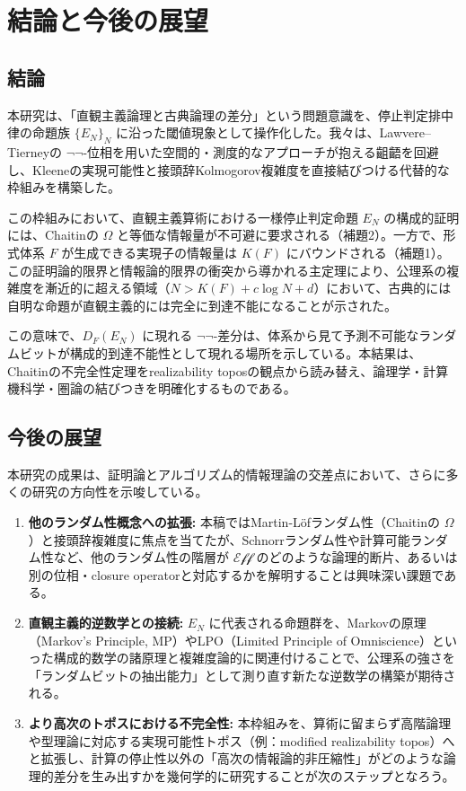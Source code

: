 \documentclass[a4paper,11pt]{ltjsarticle}
\theoremstyle{plain}
\begin{document}
\section{結論と今後の展望}

\subsection{結論}

本研究は、「直観主義論理と古典論理の差分」という問題意識を、停止判定排中律の命題族 $\{E_N\}_N$ に沿った閾値現象として操作化した。我々は、Lawvere--Tierneyの $\neg\neg$-位相を用いた空間的・測度的なアプローチが抱える齟齬を回避し、Kleeneの実現可能性と接頭辞Kolmogorov複雑度を直接結びつける代替的な枠組みを構築した。

この枠組みにおいて、直観主義算術における一様停止判定命題 $E_N$ の構成的証明には、Chaitinの $\Omega$ と等価な情報量が不可避に要求される（補題2）。一方で、形式体系 $F$ が生成できる実現子の情報量は $K(F)$ にバウンドされる（補題1）。この証明論的限界と情報論的限界の衝突から導かれる主定理により、公理系の複雑度を漸近的に超える領域（$N > K(F) + c \log N + d$）において、古典的には自明な命題が直観主義的には完全に到達不能になることが示された。

この意味で、$D_F(E_N)$ に現れる $\neg\neg$-差分は、体系から見て予測不可能なランダムビットが構成的到達不能性として現れる場所を示している。本結果は、Chaitinの不完全性定理をrealizability toposの観点から読み替え、論理学・計算機科学・圏論の結びつきを明確化するものである。

\subsection{今後の展望}

本研究の成果は、証明論とアルゴリズム的情報理論の交差点において、さらに多くの研究の方向性を示唆している。

\begin{enumerate}
\item \textbf{他のランダム性概念への拡張:} 本稿ではMartin-Löfランダム性（Chaitinの $\Omega$）と接頭辞複雑度に焦点を当てたが、Schnorrランダム性や計算可能ランダム性など、他のランダム性の階層が $\mathcal{Eff}$ のどのような論理的断片、あるいは別の位相・closure operatorと対応するかを解明することは興味深い課題である。
\item \textbf{直観主義的逆数学との接続:} $E_N$ に代表される命題群を、Markovの原理（Markov's Principle, MP）やLPO（Limited Principle of Omniscience）といった構成的数学の諸原理と複雑度論的に関連付けることで、公理系の強さを「ランダムビットの抽出能力」として測り直す新たな逆数学の構築が期待される。
\item \textbf{より高次のトポスにおける不完全性:} 本枠組みを、算術に留まらず高階論理や型理論に対応する実現可能性トポス（例：modified realizability topos）へと拡張し、計算の停止性以外の「高次の情報論的非圧縮性」がどのような論理的差分を生み出すかを幾何学的に研究することが次のステップとなろう。
\end{enumerate}
\end{document}
